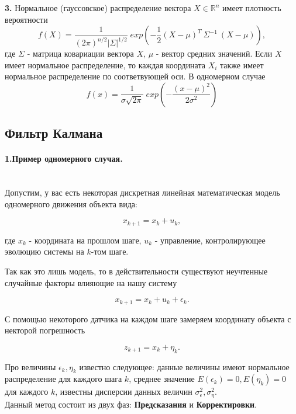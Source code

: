 \documentclass[12pt, a4paper]{article}
\begin{document}
\textbf{3.} Нормальное (гауссовское) распределение вектора $X \in \mathds{R}^n$ имеет плотность вероятности \[f(X) = \frac{1}{(2\pi)^{n/2} \vert \Sigma \vert^{1/2}} \; exp\left(-\frac{1}{2}(X-\mu)^T \: \Sigma^{-1} \:(X-\mu)\right),\]
где $\Sigma$ - матрица ковариации вектора $X$, $\mu$ - вектор средних значений. Если $X$ имеет нормальное распределение, то каждая координата $X_i$ также имеет нормальное распределение по соответвующей оси.
В одномерном случае
\[f(x) = \frac{1}{\sigma \sqrt{2\pi}} \; exp\left(-\frac{(x-\mu)^2}{2\sigma^2}\right)\]

\newpage
\subsection*{Фильтр Калмана}
\paragraph*{1.Пример одномерного случая.}

\quad \\ Допустим, у вас есть некоторая дискретная линейная математическая модель одномерного движения объекта вида:

\begin{equation}
x_{k+1} = x_{k} + u_{k},
\end{equation}

где $x_{k}$ - координата на прошлом шаге, $u_{k}$ - управление, контролирующее эволюцию системы на $k$-том шаге.

Так как это лишь модель, то в действительности существуют неучтенные случайные факторы влияющие на нашу систему

\begin{equation}
x_{k+1} = x_{k} + u_{k} + \epsilon_{k}.
\end{equation}

С помощью некоторого датчика на каждом шаге замеряем координату объекта с некторой погрешность

\begin{equation}
z_{k+1} = x_{k} + \eta_{k}.
\end{equation}


Про величины $\epsilon_{k}, \eta_{k}$ известно следующее: данные величины имеют нормальное распределение для каждого шага $k$, среднее значение $E(\epsilon_{k}) = 0, E(\eta_{k}) = 0$ для каждого $k$, известны дисперсии данных величин $\sigma_{\epsilon}^2, \sigma_{\eta}^2$.\\

Данный метод состоит из двух фаз: \textbf{Предсказания} и \textbf{Корректировки}.
\end{document}
